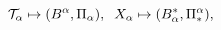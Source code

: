 \begin{equation}
{\cal T}_{\alpha}\mapsto(B^{\alpha},\Pi_{\alpha}),\;\;X_{\alpha}
\mapsto(B_{\alpha}^{\ast},\Pi_{\ast}^{\alpha}),\label{3.10}%
\end{equation}

